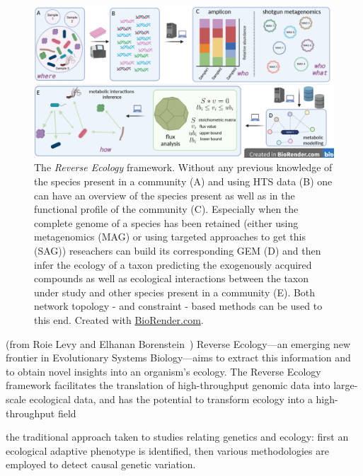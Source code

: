       \begin{figure}[!h]
         \centering
         \includegraphics[width=135mm]{figures/reverse_ecology.png}
         \caption[The \textit{Reverse Ecology} framework.]{The \textit{Reverse Ecology} framework. Without any previous knowledge of the species present in a community (A) and using HTS data (B) one can have an overview of the species present 
         as well as in the functional profile of the community (C).
         Especially when the complete genome of a species has been retained (either using 
         metagenomics (MAG) or using targeted approaches to get this (SAG))
         reseachers can build its corresponding GEM (D) and then 
         infer the ecology of a taxon predicting 
         the exogenously acquired compounds as well as ecological interactions between the taxon under study and other species present in a community (E). 
         Both network topology - and constraint - based methods can be used to this end.
         Created with \href{BioRender.com}{BioRender.com}.
         }
         \label{fig:revecol}
      \end{figure}


      (from Roie Levy and Elhanan Borenstein~\cite{levy2012reverse})
      Reverse Ecology—an emerging new frontier in Evolutionary Systems Biology—aims
      to extract this information and to obtain novel insights into an organism’s ecology.
      The Reverse Ecology framework facilitates the translation of high-throughput
      genomic data into large-scale ecological data, and has the potential to transform
      ecology into a high-throughput field


      the traditional approach taken to studies relating genetics and ecology:
      first an ecological adaptive phenotype is identified, then various methodologies are
      employed to detect causal genetic variation.






